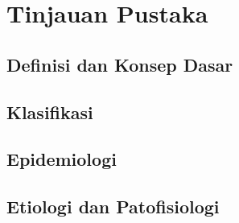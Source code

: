 \chapter{Tinjauan Pustaka}


\section{Definisi dan Konsep Dasar}


\section{Klasifikasi}


\section{Epidemiologi}


\section{Etiologi dan Patofisiologi}


